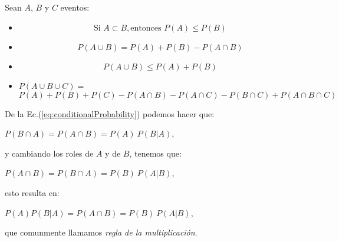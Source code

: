 \begin{tcolorbox}[colback=blue!5!white,colframe=blue!60!black,title=Resumen: Propiedades de las leyes de la probabilidad]
    Sean $A$, $B$ y $C$ eventos:

    \begin{itemize}
        \item
        \begin{equation}
            \text{Si } A \subset B, \text{entonces } P(A) \leq P(B)
            \label{eq:propProb1}
        \end{equation}
        
        \item 
        \begin{equation}
        P(A \cup B) = P(A) + P(B) - P(A \cap B)
        \label{eq:propProb2}
        \end{equation}

        \item 
        \begin{equation}
            P(A \cup B) \leq P(A) + P(B)
            \label{eq:propProb3}
        \end{equation}

    \item
    $P(A \cup B \cup C)=$
    \begin{equation}
        P(A) + P(B) + P(C) - P(A \cap B) - P(A \cap C) - 
        P(B \cap C) + P(A \cap B \cap C)
        \label{eq:propProb4}
    \end{equation}
    \end{itemize}
\end{tcolorbox}

De la Ec.(\ref{eq:conditionalProbability}) podemos hacer que:

\begin{center}
$P(B \cap A) = P(A \cap B) = P(A) \  P(B|A)$, 
\end{center}

y cambiando los roles de $A$ y de $B$, tenemos que:

\begin{center}
    $P(A \cap B) = P(B \cap A) = P(B) \ P(A|B)$, 
\end{center}

esto resulta en:

\begin{center}
    $P(A)P(B|A) = P(A \cap B) = P(B) \ P(A|B)$,
\end{center}

que comunmente llamamos \textit{regla de la multiplicación}.

